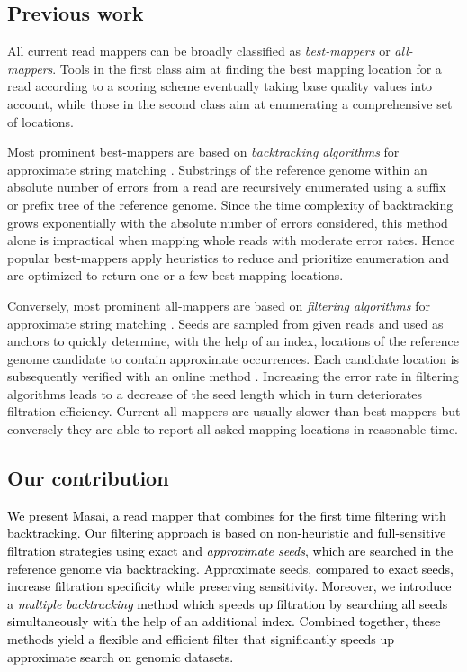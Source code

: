 \documentclass[a4,center,fleqn]{article}
\begin{document}
\subsection{Previous work}

All current read mappers can be broadly classified as \emph{best-mappers} or \emph{all-mappers}.
Tools in the first class aim at finding the best mapping location for a read according to a scoring scheme eventually taking base quality values into account, while those in the second class aim at enumerating a comprehensive set of locations.

Most prominent best-mappers are based on \emph{backtracking algorithms} for approximate string matching \textcolor{black}{\cite{Navarro2001}}.
Substrings of the reference genome within an absolute number of errors from a read \textcolor{black}{are} recursively enumerated using a suffix or prefix tree of the reference genome.
Since the time complexity of backtracking grows exponentially with the absolute number of errors considered, this method alone \textcolor{black}{is} impractical when mapping \textcolor{black}{whole} reads with moderate error rates.
Hence popular best-mappers \cite{Bowtie2, BWA, Soap2} apply heuristics to reduce and prioritize enumeration and are optimized to return one or a few best mapping locations.

Conversely, most prominent all-mappers are based on \emph{filtering algorithms} for approximate string matching \textcolor{black}{\cite{Navarro2001}}.
Seeds are sampled from given reads and used as anchors to quickly determine, with the help of an index, locations of the reference genome candidate to contain approximate occurrences.
Each candidate location \textcolor{black}{is} subsequently verified with an online method \textcolor{black}{\cite{Navarro2001b}}.
Increasing the error rate in filtering algorithms leads to a decrease of the seed length which in turn deteriorates filtration efficiency.
Current all-mappers \cite{Razers3, Ahmadi2011, Alkan2009, Shrimp2} are usually slower than best-mappers but conversely they are able to report all asked mapping locations in reasonable time.

\subsection{Our contribution}

\enlargethispage{-65.1pt}
\textcolor{black}
{
We present Masai, a read mapper that combines for the first time filtering with backtracking.
Our filtering approach is based on non-heuristic and full-sensitive filtration strategies using exact and \emph{approximate seeds}, which are searched in the reference genome via backtracking.
Approximate seeds, compared to exact seeds, increase filtration specificity while preserving sensitivity.
Moreover, we introduce a \emph{multiple backtracking} method which speeds up filtration by searching all seeds simultaneously with the help of an additional index.
Combined together, these methods yield a flexible and efficient filter that significantly speeds up approximate search on genomic datasets.}
\end{document}
